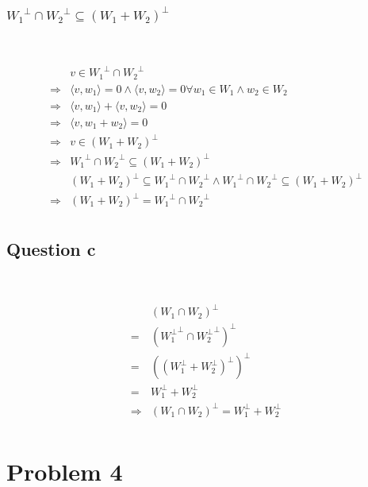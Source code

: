\documentclass{article}
\begin{document}
\subsubsection*{${W_1}^\perp\cap {W_2}^\perp\subseteq (W_1+W_2)^\perp$}

~

\begin{equation*}
    \begin{split}
        &v\in{W_1}^\perp\cap {W_2}^\perp\\
        \Rightarrow&\langle v,w_1\rangle=0\land \langle v,w_2\rangle=0\forall w_1\in W_1\land w_2\in W_2\\
        \Rightarrow&\langle v,w_1\rangle+\langle v,w_2\rangle =0\\
        \Rightarrow&\langle v,w_1+w_2\rangle=0\\
        \Rightarrow&v\in (W_1+W_2)^\perp\\
        \Rightarrow&{W_1}^\perp\cap {W_2}^\perp\subseteq (W_1+W_2)^\perp\\
        &(W_1+W_2)^\perp\subseteq {W_1}^\perp\cap {W_2}^\perp\land{W_1}^\perp\cap {W_2}^\perp\subseteq (W_1+W_2)^\perp\\
        \Rightarrow&(W_1+W_2)^\perp= {W_1}^\perp\cap {W_2}^\perp\\
    \end{split}
\end{equation*}

\subsection{Question c}

~

\begin{equation*}
    \begin{split}
        &(W_1\cap W_2)^\perp\\
        =&({W_1^\perp}^\perp\cap{W_2^\perp}^\perp)^\perp\\
        =&((W_1^\perp+W_2^\perp)^\perp)^\perp\\
        =&W_1^\perp+W_2^\perp\\
        \Rightarrow&(W_1\cap W_2)^\perp=W_1^\perp+W_2^\perp\\
    \end{split}
\end{equation*}

\newpage

\section{Problem 4}
\end{document}
